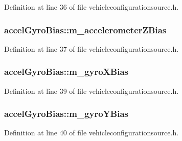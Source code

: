 Definition at line 36 of file vehicleconfigurationsource.\-h.

\hypertarget{group___vehicle_configuration_source_gaa0475cba1c09df9c39a69bbb62711b8e}{
\subsubsection[{m\-\_\-accelerometer\-Z\-Bias}]{ accel\-Gyro\-Bias\-::m\-\_\-accelerometer\-Z\-Bias}}\label{group___vehicle_configuration_source_gaa0475cba1c09df9c39a69bbb62711b8e}


Definition at line 37 of file vehicleconfigurationsource.\-h.

\hypertarget{group___vehicle_configuration_source_ga483a0631083ce446a08b73ecc712ed73}{
\subsubsection[{m\-\_\-gyro\-X\-Bias}]{ accel\-Gyro\-Bias\-::m\-\_\-gyro\-X\-Bias}}\label{group___vehicle_configuration_source_ga483a0631083ce446a08b73ecc712ed73}


Definition at line 39 of file vehicleconfigurationsource.\-h.

\hypertarget{group___vehicle_configuration_source_gade8f76b5b608f6446cb182c372598e53}{
\subsubsection[{m\-\_\-gyro\-Y\-Bias}]{ accel\-Gyro\-Bias\-::m\-\_\-gyro\-Y\-Bias}}\label{group___vehicle_configuration_source_gade8f76b5b608f6446cb182c372598e53}


Definition at line 40 of file vehicleconfigurationsource.\-h.

